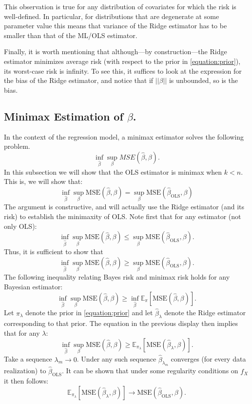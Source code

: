 \documentclass[11pt]{article} %
\begin{document}
This observation is true for any distribution of covariates for which the risk is well-defined. In particular, for distributions that are degenerate at some parameter value this means that variance of the Ridge estimator has to be smaller than that of the ML/OLS estimator.

Finally, it is worth mentioning that although---by construction---the Ridge estimator minimizes average risk (with respect to the prior in \eqref{equation:prior}), its worst-case risk is infinity.  To see this, it suffices to look at the expression for the bias of the Ridge estimator, and notice that if $|| \beta ||$ is unbounded, so is the bias. 


\subsection{Minimax Estimation of $\beta$. }
In the context of the regression model, a minimax estimator solves the following problem. 
\[ \inf_{\widehat{\beta}} \sup_{\beta} MSE(\widehat{\beta},\beta).    \] 
In this subsection we will show that the OLS estimator is minimax when $k<n$. This is, we will show that:
\begin{equation} \label{equation:minimax_OLS}
\inf_{\widehat{\beta}} \sup_{\beta} \textrm{MSE}(\widehat{\beta},\beta) = \sup_{\beta} \textrm{MSE}(\widehat{\beta}_{\textrm{OLS}},\beta)
\end{equation}
The argument is constructive, and will actually use the Ridge estimator (and its risk) to establish the minimaxity of OLS. Note first that for any estimator (not only OLS):
\[\inf_{\widehat{\beta}} \sup_{\beta} \textrm{MSE}(\widehat{\beta},\beta) \leq \sup_{\beta} \textrm{MSE}(\widehat{\beta}_{\textrm{OLS}},\beta).\]
Thus, it is sufficient to show that 
\[\inf_{\widehat{\beta}} \sup_{\beta} \textrm{MSE}(\widehat{\beta},\beta) \geq \sup_{\beta} \textrm{MSE}(\widehat{\beta}_{\textrm{OLS}},\beta).\]
The following inequality relating Bayes risk and minimax risk holds for any Bayesian estimator:
\[  \inf_{\widehat{\beta}} \sup_{\beta} \textrm{MSE}(\widehat{\beta},\beta)       \geq  \inf_{\widehat{\beta}} \mathbb{E}_{\pi} \left[ \textrm{MSE}(\widehat{\beta},\beta) \right].   \] 
Let $\pi_{\lambda}$ denote the prior in \eqref{equation:prior} and let $\widehat{\beta}_{\lambda}$ denote the Ridge estimator corresponding to that prior. The equation in the previous display then implies that for any $\lambda$:
 \[ \inf_{\widehat{\beta}} \sup_{\beta} \textrm{MSE}(\widehat{\beta},\beta)       \geq  \mathbb{E}_{\pi_{\lambda}} \left[ \textrm{MSE}(\widehat{\beta}_{\lambda},\beta) \right]. \]
Take a sequence $\lambda_{m} \rightarrow 0$. Under any such sequence $\widehat{\beta}_{\lambda_m}$ converges (for every data realization) to $\widehat{\beta}_{\textrm{OLS}}$. It can be shown that under some regularity conditions on $f_{X}$ it then follows:
\[   \mathbb{E}_{\pi_{\lambda}} \left[  \textrm{MSE}(\widehat{\beta}_{\lambda},\beta) \right]  \rightarrow  \textrm{MSE}(\widehat{\beta}_{\textrm{OLS}},\beta).  \]
\end{document}
